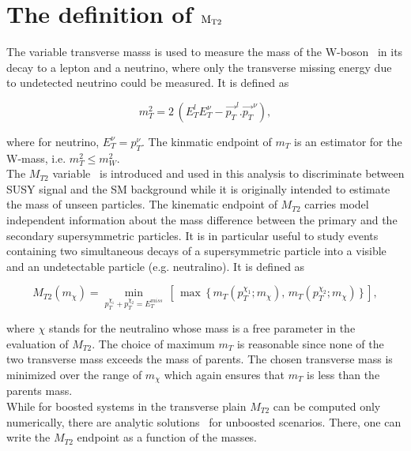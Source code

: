 \section{\texorpdfstring{The definition of $\rm {M_{T2}}$}{The definition of MT2}}
\label{sect:mt2def}
The variable transverse masss is used to measure the mass of the W-boson~\cite{Arnison:1983rp,Banner:1983jy,Affolder:2000bpa,Abazov:2002bu} in its decay to a lepton and a neutrino, where only the transverse missing energy due to undetected neutrino could be measured. It is defined as 
\begin{linenomath}
\begin{equation}
\label{eq:mtdef}
m_{T}^{2}= 2\,( E_T^lE_T^\nu-\vec{p_T}^l.\vec{p_T}^\nu ),
\end{equation}
\end{linenomath}
where for neutrino, $E_T^\nu=p_T^\nu$. The kinmatic endpoint of $m_T$ is an estimator for the W-mass, i.e. $m_T^2\leq m_W^2$. \\
The $M_{T2}$ variable~\cite{Lester:1999tx,Barr:2003rg} is introduced and used in this analysis to discriminate between SUSY signal and the SM background while it is originally intended to estimate the mass of unseen particles. The kinematic endpoint of $M_{T2}$ carries model independent information about the mass difference between the primary and the secondary supersymmetric particles. It is in particular useful to study events containing two simultaneous decays of a supersymmetric particle into a visible and an undetectable particle (e.g. neutralino). It is defined as
\begin{linenomath}
\begin{equation}
\label{eq:mt2def}
M_{T2}(m_{\chi})= \min_{p_{T}^{\chi_1}+p_{T}^{\chi_2}=E_T^{miss}}\,\left[\,\max\,\{ \, m_{T}(p_T^{\chi_1};m_{\chi}),\,m_{T}(p_T^{\chi_2};m_{\chi})\,\}\,\right],
\end{equation}
\end{linenomath}
where $\chi$ stands for the neutralino whose mass is a free parameter in the evaluation of $M_{T2}$. The choice of maximum $m_T$ is reasonable since none of the two transverse mass exceeds the mass of parents. The chosen transverse mass is minimized over the range of $m_{\chi}$ which again ensures that $m_T$ is less than the parents mass. \\
While for boosted systems in the transverse plain $M_{T2}$ can be computed only numerically, there are analytic solutions~\cite{Cho:2007dh} for unboosted scenarios. There, one can write the $M_{T2}$ endpoint as a function of the masses. \\
